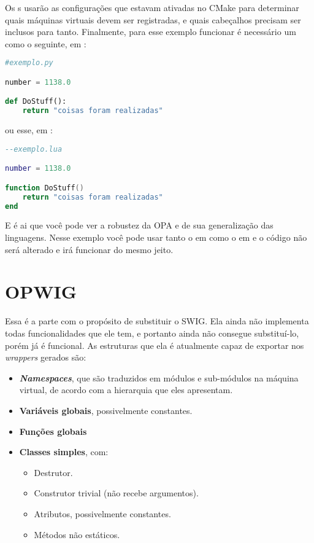 Os s usarão as configurações que estavam ativadas no CMake para
determinar quais máquinas virtuais devem ser registradas, e quais cabeçalhos
precisam ser inclusos para tanto.
Finalmente, para esse exemplo funcionar é necessário um \script{} como o seguinte,
em :

\vspace{2.5em}
\begin{lstlisting}[language=python]
#exemplo.py

number = 1138.0

def DoStuff():
    return "coisas foram realizadas"
\end{lstlisting}
\vspace{1em}

ou esse, em :

\vspace{1em}
\begin{lstlisting}[language=lua]
--exemplo.lua

number = 1138.0

function DoStuff()
    return "coisas foram realizadas"
end
\end{lstlisting}
\vspace{1em}

E é ai que você pode ver a robustez da OPA e de sua generalização das linguagens.
Nesse exemplo você pode usar tanto o \script{} em  como o \script{} em
 e o código \CXX{} não será alterado e irá funcionar do mesmo jeito.

\section{OPWIG}
\label{cap:resultados:opwig}

Essa é a parte com o propósito de substituir o SWIG.
Ela ainda não implementa todas funcionalidades que ele tem, e portanto
ainda não consegue substituí-lo, porém já é funcional.
As estruturas \CXX{} que ela é atualmente capaz de exportar nos \textit{wrappers}
gerados são:

\begin{itemize}
  \item \textbf{\textit{Namespaces}}, que são traduzidos em módulos e sub-módulos
        na máquina virtual, de acordo com a hierarquia que eles apresentam.
  \item \textbf{Variáveis globais}, possivelmente constantes.
  \item \textbf{Funções globais}
  \item \textbf{Classes simples}, com:
    \begin{itemize}
      \item Destrutor.
      \item Construtor trivial (não recebe argumentos).
      \item Atributos, possivelmente constantes.
      \item Métodos não estáticos.
    \end{itemize}
\end{itemize}

